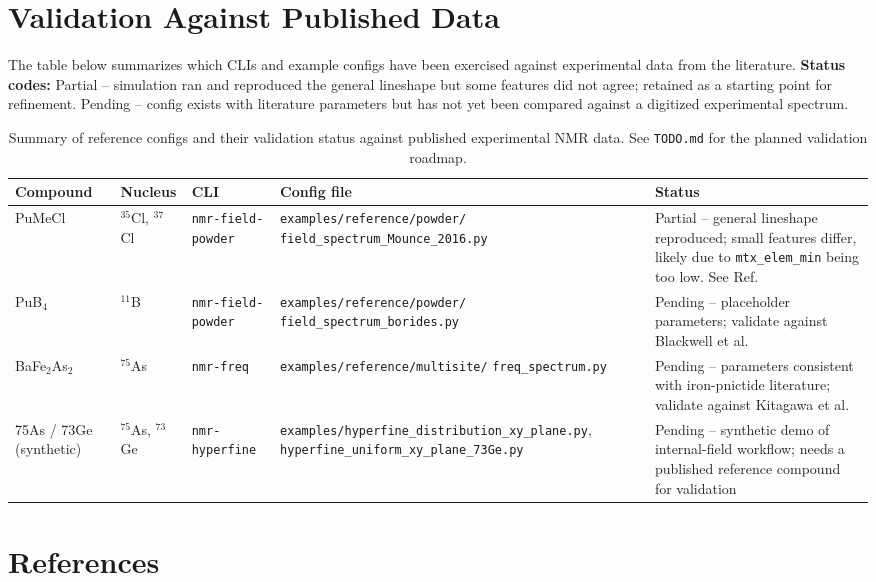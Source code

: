 \documentclass[12pt]{article}
\begin{document}

\section{Validation Against Published Data}

The table below summarizes which CLIs and example configs have been exercised
against experimental data from the literature.
\textbf{Status codes:}
Partial -- simulation ran and reproduced the general lineshape but some features
did not agree; retained as a starting point for refinement.
Pending -- config exists with literature parameters but has not yet been compared
against a digitized experimental spectrum.

\begin{table}[h]
\centering
\small
\renewcommand{\arraystretch}{1.4}
\begin{tabular}{p{2.6cm}p{1.8cm}p{2.6cm}p{4.8cm}p{2.8cm}}
\hline
\textbf{Compound} & \textbf{Nucleus} & \textbf{CLI} & \textbf{Config file} & \textbf{Status} \\
\hline
PuMeCl & $^{35}$Cl, $^{37}$Cl &
  \texttt{nmr-field-powder} &
  \texttt{examples/reference/powder/} \newline
  \texttt{field\_spectrum\_Mounce\_2016.py} &
  Partial -- general lineshape reproduced; small features differ, likely
  due to \texttt{mtx\_elem\_min} being too low.
  See Ref.~\cite{Mounce_2016_PuMeCl} \\
\hline
PuB$_4$ & $^{11}$B &
  \texttt{nmr-field-powder} &
  \texttt{examples/reference/powder/} \newline
  \texttt{field\_spectrum\_borides.py} &
  Pending -- placeholder parameters; validate against Blackwell et al. \\
\hline
BaFe$_2$As$_2$ & $^{75}$As &
  \texttt{nmr-freq} &
  \texttt{examples/reference/multisite/} \newline
  \texttt{freq\_spectrum.py} &
  Pending -- parameters consistent with iron-pnictide literature; validate
  against Kitagawa et al. \\
\hline
75As / 73Ge (synthetic) & $^{75}$As, $^{73}$Ge &
  \texttt{nmr-hyperfine} &
  \texttt{examples/hyperfine\_distribution\_xy\_plane.py},
  \texttt{hyperfine\_uniform\_xy\_plane\_73Ge.py} &
  Pending -- synthetic demo of internal-field workflow; needs a published
  reference compound for validation \\
\hline
\end{tabular}
\caption{Summary of reference configs and their validation status against
published experimental NMR data. See \texttt{TODO.md} for the planned
validation roadmap.}
\label{tab:validation}
\end{table}

\section{References}

\end{document}

